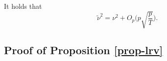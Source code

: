 \begin{lemmaA}\label{lemma-lrv-5}
It holds that 
\[ \widetilde{\nu}^2 = \nu^2 + O_p\Big( p \sqrt{\frac{p}{T}} \Big). \]
\end{lemmaA}





\newpage


\subsection*{Proof of Proposition \ref{prop-lrv}}


